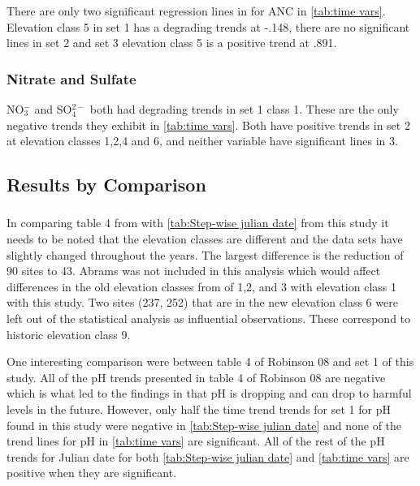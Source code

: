 There are only two significant regression lines in for ANC in \autoref{tab:time vars}. Elevation class 5 in set 1 has a degrading trends at -.148, there are no significant lines in set 2 and set 3 elevation class 5 is a positive trend at .891.

\subsubsection{Nitrate and Sulfate}

NO$_3^-$ and SO$_4^{2-}$ both had degrading trends in set 1 class 1. These are the only negative trends they exhibit in \autoref{tab:time vars}.  Both have positive trends in set 2 at elevation classes 1,2,4 and 6, and neither variable have significant lines in 3.

\subsection{Results by Comparison}

\subsubsection{\citep{robinson2008ph}}

In comparing table 4 from \citet{robinson2008ph} with \autoref{tab:Step-wise julian date} from this study it needs to be noted that the elevation classes are different and the data sets have slightly changed throughout the years. The largest difference is the reduction of 90 sites to 43. Abrams was not included in this analysis which would affect differences in the old elevation classes from \citet{robinson2008ph} of 1,2, and 3 with elevation class 1 with this study. Two sites (237, 252) that are in the new elevation class 6 were left out of the statistical analysis as influential observations. These correspond to historic elevation class 9.

One interesting comparison were between table 4 of Robinson 08 and set 1 of this study. All of the pH trends presented in table 4 of Robinson 08 are negative which is what led to the findings in \citet{robinson2008ph} that pH is dropping and can drop to harmful levels in the future. However, only half the time trend trends for set 1 for pH found in this study were negative in \autoref{tab:Step-wise julian date} and none of the trend lines for pH in \autoref{tab:time vars} are significant. All of the rest of the pH trends for Julian date for both \autoref{tab:Step-wise julian date} and \autoref{tab:time vars} are positive when they are significant.

